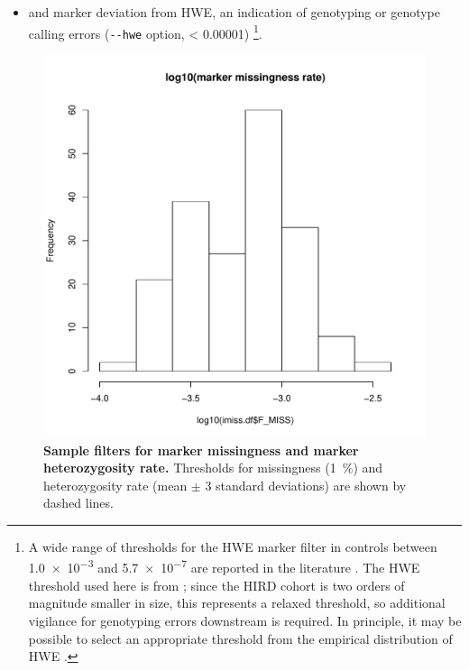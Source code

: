 \begin{itemize}
    \item and marker deviation from \gls{HWE}, an indication of genotyping or genotype calling errors \autocite{mccarthy2008GenomewideAssociationStudies,anderson2010DataQualityControl,marees2018TutorialConductingGenomewide} (\texttt{-{}-hwe} option, \pvalue{} \num[scientific-notation=true]{< 0.00001})%
        \footnote{
            A wide range of thresholds for the \gls{HWE} marker filter in controls between \num{1.0e-3} and \num{5.7e-7} are reported in the literature \autocite{anderson2010DataQualityControl}.
            The \gls{HWE} threshold used here is from \textcite{delange2017GenomewideAssociationStudy};
            since the \gls{HIRD} cohort is two orders of magnitude smaller in size, this represents a relaxed threshold, so additional vigilance for genotyping errors downstream is required.
            In principle, it may be possible to select an appropriate threshold from the empirical distribution of \gls{HWE} \pvalues{} \autocite{mccarthy2008GenomewideAssociationStudies}.
        }.
\end{itemize}

\begin{figure}
    \includegraphics[width=1.0\textwidth,page=2]{mainmatter/figures/chapter_02/coreex_eQTLflu_20171204.gencall.smajor.impute_sex.qc2.pdf}
    \caption{
        \textbf{Sample filters for marker missingness and marker heterozygosity rate.}
        Thresholds for missingness (\SI{1}{\percent}) and heterozygosity rate (mean $\pm$ 3 standard deviations) are shown by dashed lines.
    }
    \label{fig:hird_genotype_sample_hetRate_missingness}
\end{figure}

